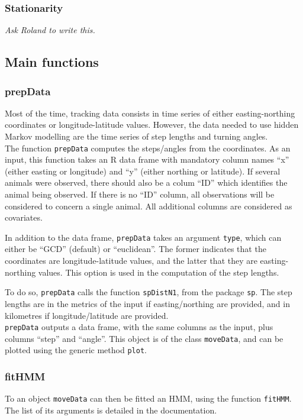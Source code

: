 \documentclass[]{article}
\begin{document}
\subsubsection{Stationarity}
\textit{Ask Roland to write this.}

\subsection{Main functions} \label{main_functions}

\subsubsection{prepData}
Most of the time, tracking data consists in time series of either easting-northing coordinates or longitude-latitude values. However, the data needed to use hidden Markov modelling are the time series of step lengths and turning angles.\\

The function \texttt{prepData} computes the steps/angles from the coordinates. As an input, this function takes an R data frame with mandatory column names ``x'' (either easting or longitude) and ``y'' (either northing or latitude). If several animals were observed, there should also be a colum ``ID'' which identifies the animal being observed. If there is no ``ID'' column, all observations will be considered to concern a single animal. All additional columns are considered as covariates.

In addition to the data frame, \texttt{prepData} takes an argument \texttt{type}, which can either be ``GCD'' (default) or ``euclidean''. The former indicates that the coordinates are longitude-latitude values, and the latter that they are easting-northing values. This option is used in the computation of the step lengths.

To do so, \texttt{prepData} calls the function \texttt{spDistN1}, from the package \texttt{sp}. The step lengths are in the metrics of the input if easting/northing are provided, and in kilometres if longitude/latitude are provided.\\

\texttt{prepData} outputs a data frame, with the same columns as the input, plus columns ``step'' and ``angle''. This object is of the class \texttt{moveData}, and can be plotted using the generic method \texttt{plot}.

\subsubsection{fitHMM}
To an object \texttt{moveData} can then be fitted an HMM, using the function \texttt{fitHMM}. The list of its arguments is detailed in the documentation.
\end{document}
